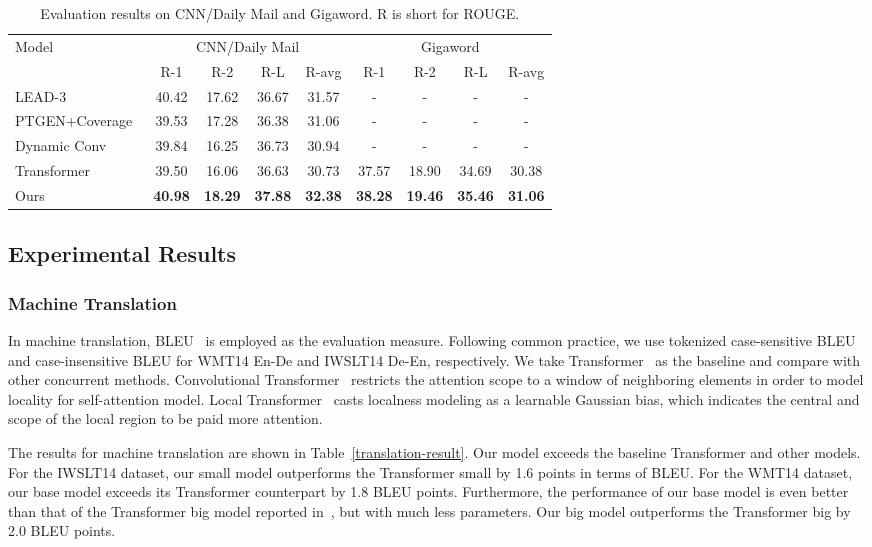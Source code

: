 \documentclass[11pt]{article}
\begin{document}
\begin{table*}
\begin{center}
\begin{tabular}{lcccccccc}
\midrule[1.0pt]
\multirow{2}{*}{Model} &\multicolumn{4}{c}{CNN/Daily Mail} &\multicolumn{4}{c}{Gigaword}\\
&R-1 &R-2 &R-L &R-avg &R-1 &R-2 &R-L &R-avg \\
\midrule[1.0pt]
LEAD-3~\cite{nallapati2016abstractive} 
&40.42 &17.62 &36.67 &31.57 &- &- &- &-\\
PTGEN+Coverage~\cite{see2017get} 
&39.53 &17.28 &36.38 &31.06 &- &- &- &- \\
Dynamic Conv~\cite{wu2019pay} 
&39.84 &16.25 &36.73 &30.94 &- &- &- &- \\
Transformer~\cite{vaswani2017attention} 
&39.50 &16.06 &36.63 &30.73 &37.57 &18.90 &34.69 &30.38 \\
\midrule[0.5pt]
Ours &\textbf{40.98} &\textbf{18.29} &\textbf{37.88} &\textbf{32.38} &\textbf{38.28} &\textbf{19.46} &\textbf{35.46} & \textbf{31.06} \\
\midrule[1.0pt]
\end{tabular}
\end{center}
\caption{Evaluation results on CNN/Daily Mail and Gigaword. R is short for ROUGE.}
\label{summarization-result}
\end{table*}

\subsection{Experimental Results}
\label{experiment-results}
\subsubsection{Machine Translation}
In machine translation, BLEU~\cite{papineni2002bleu} is employed as the evaluation measure. Following common practice, we use tokenized case-sensitive BLEU and case-insensitive BLEU for WMT14 En-De and IWSLT14 De-En, respectively. We take Transformer~\cite{vaswani2017attention} as the baseline and compare with other concurrent methods. Convolutional Transformer~\cite{yang2019convolutional} restricts the attention scope to a window of neighboring elements in order to model locality for self-attention model. 
Local Transformer~\cite{yang2018modeling} casts localness modeling as a learnable Gaussian bias, which indicates the central and scope of the local region to be paid more attention. 


The results for machine translation are shown in Table~\ref{translation-result}.
Our model exceeds the baseline Transformer and other models. For the IWSLT14 dataset, our small model outperforms the Transformer small by 1.6 points in terms of BLEU. For the WMT14 dataset, our base model exceeds its Transformer counterpart by 1.8 BLEU points. Furthermore, the performance of our base model is even better than that of the Transformer big model reported in~\cite{vaswani2017attention}, but with much less parameters. Our big model outperforms the Transformer big by 2.0 BLEU points. 
\end{document}

